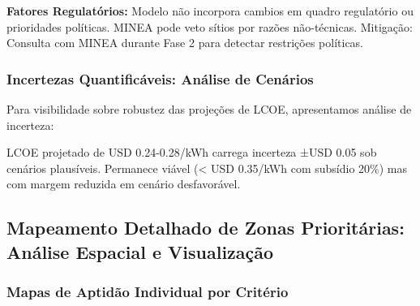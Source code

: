 \documentclass[12pt, a4paper]{article}
\begin{document}
\textbf{Fatores Regulatórios:} Modelo não incorpora cambios em quadro regulatório ou prioridades políticas. MINEA pode veto sítios por razões não-técnicas. Mitigação: Consulta com MINEA durante Fase 2 para detectar restrições políticas.

\subsubsection{Incertezas Quantificáveis: Análise de Cenários}

Para visibilidade sobre robustez das projeções de LCOE, apresentamos análise de incerteza:

\begin{table}[H]
\centering
\caption{Incertezas Quantificáveis e Impacto em LCOE (USD/kWh)}
\label{tab:lcoe_uncertainty}
\footnotesize
{}
\end{table}

LCOE projetado de USD 0.24-0.28/kWh carrega incerteza ±USD 0.05 sob cenários plausíveis. Permanece viável (< USD 0.35/kWh com subsídio 20\%) mas com margem reduzida em cenário desfavorável.

\subsection{Mapeamento Detalhado de Zonas Prioritárias: Análise Espacial e Visualização}

\subsubsection{Mapas de Aptidão Individual por Critério}
\end{document}
